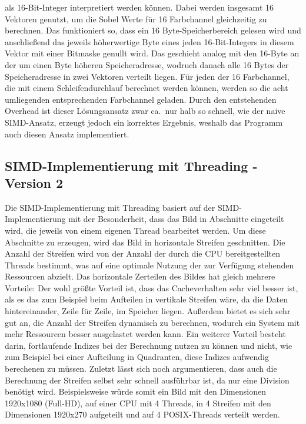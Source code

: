 \documentclass[course=erap]{aspdoc}
\begin{document}
als 16-Bit-Integer interpretiert werden können.
Dabei werden insgesamt 16 Vektoren genutzt, um die Sobel Werte für 16 Farbchannel gleichzeitig zu berechnen.
Das funktioniert so, dass ein 16 Byte-Speicherbereich gelesen wird und anschließend das jeweils höherwertige Byte eines jeden
16-Bit-Integers in diesem Vektor mit einer Bitmaske genullt wird.
Das geschieht analog mit den 16-Byte an der um einen Byte höheren Speicheradresse, wodruch danach alle 16 Bytes der Speicheradresse in zwei Vektoren verteilt liegen.
Für jeden der 16 Farbchannel, die mit einem Schleifendurchlauf berechnet werden können, werden so die acht umliegenden entsprechenden Farbchannel geladen.
Durch den entstehenden Overhead ist dieser Lösungsansatz zwar ca.\ nur halb so schnell, wie der naive SIMD-Ansatz, erzeugt jedoch ein korrektes Ergebnis, weshalb das Programm auch diesen Ansatz implementiert.

\subsection{SIMD-Implementierung mit Threading - Version 2}
\label{subsec:simd-threading}
Die SIMD-Implementierung mit Threading basiert auf der SIMD-Implementierung mit der Besonderheit, dass das Bild in Abschnitte eingeteilt wird, die jeweils von einem eigenen Thread bearbeitet werden.
Um diese Abschnitte zu erzeugen, wird das Bild in horizontale Streifen geschnitten.
Die Anzahl der Streifen wird von der Anzahl der durch die CPU bereitgestellten Threads bestimmt, was auf eine optimale Nutzung der zur Verfügung stehenden Ressourcen abzielt.
Das horizontale Zerteilen des Bildes hat gleich mehrere Vorteile:
Der wohl größte Vorteil ist, dass das Cacheverhalten sehr viel besser ist, als es das zum Beispiel beim Aufteilen in vertikale Streifen wäre, da die Daten hintereinander, Zeile für Zeile, im Speicher liegen.
Außerdem bietet es sich sehr gut an, die Anzahl der Streifen dynamisch zu berechnen, wodurch ein System mit mehr Ressourcen besser ausgelastet werden kann.
Ein weiterer Vorteil besteht darin, fortlaufende Indizes bei der Berechnung nutzen zu können und nicht, wie zum Beispiel bei einer Aufteilung in Quadranten, diese Indizes aufwendig berechenen zu müssen.
Zuletzt lässt sich noch argumentieren, dass auch die Berechnung der Streifen selbst sehr schnell ausführbar ist, da nur eine Division benötigt wird.
Beispielsweise würde somit ein Bild mit den Dimensionen 1920x1080 (Full-HD), auf einer CPU mit 4 Threads, in 4 Streifen mit den Dimensionen 1920x270 aufgeteilt und auf 4 POSIX-Threads verteilt werden.
\end{document}
